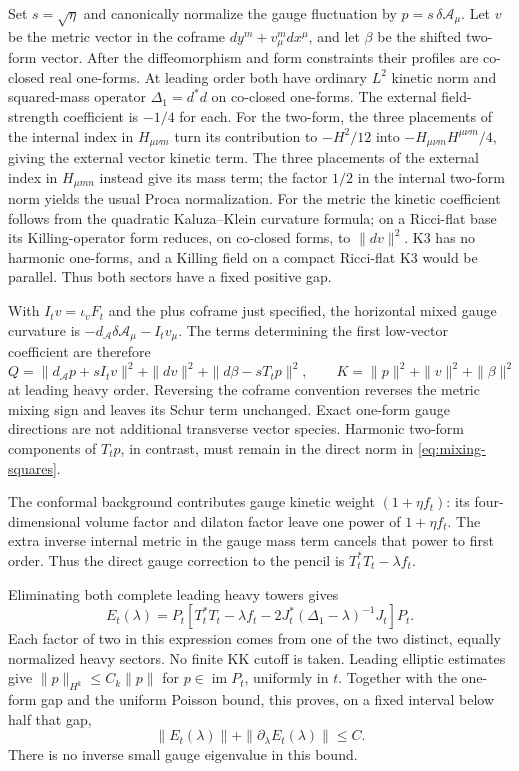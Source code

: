 Set $s=\sqrt\eta$ and canonically normalize the gauge fluctuation by
$p=s\,\delta\mathcal A_\mu$. Let $v$ be the metric vector in the
coframe $dy^m+v^m_\mu dx^\mu$, and let $\beta$ be the shifted
two-form vector. After the diffeomorphism and form constraints their
profiles are co-closed real one-forms. At leading order both have
ordinary $L^2$ kinetic norm and squared-mass operator
$\Delta_1=d^*d$ on co-closed one-forms. The external field-strength
coefficient is $-1/4$ for each. For the two-form, the three placements
of the internal index in $H_{\mu\nu m}$ turn its contribution to
$-H^2/12$ into $-H_{\mu\nu m}H^{\mu\nu m}/4$, giving the
external vector kinetic term. The three placements of the external
index in $H_{\mu mn}$ instead give its mass term; the factor
$1/2$ in the internal two-form norm yields the usual Proca
normalization. For the metric the kinetic coefficient follows from the
quadratic Kaluza--Klein curvature formula; on a Ricci-flat base its
Killing-operator form reduces, on co-closed forms, to $\|dv\|^2$.
K3 has no harmonic one-forms, and a Killing field on a compact
Ricci-flat K3 would be parallel. Thus both sectors have a fixed
positive gap.

With $I_tv=\iota_vF_t$ and the plus coframe just specified, the
horizontal mixed gauge curvature is
$-d_{\mathcal A}\delta\mathcal A_\mu-I_tv_\mu$.
The terms determining the first low-vector coefficient are therefore
\begin{equation}\label{eq:mixing-squares}
 Q=\|d_{\mathcal A}p+sI_tv\|^2+\|dv\|^2
                      +\|d\beta-sT_tp\|^2,
 \qquad K=\|p\|^2+\|v\|^2+\|\beta\|^2
\end{equation}
at leading heavy order. Reversing the coframe convention reverses
the metric mixing sign and leaves its Schur term unchanged. Exact
one-form gauge directions are not additional transverse vector
species. Harmonic two-form components of $T_tp$, in contrast, must
remain in the direct norm in \eqref{eq:mixing-squares}.

The conformal background contributes gauge kinetic weight
$(1+\eta f_t)$: its four-dimensional volume factor and dilaton
factor leave one power of $1+\eta f_t$. The extra inverse internal
metric in the gauge mass term cancels that power to first order.
Thus the direct gauge correction to the pencil is
$T_t^*T_t-\lambda f_t$.

Eliminating both complete leading heavy towers gives
\begin{equation}\label{eq:effectivecoefficient}
 E_t(\lambda)=P_t\left[T_t^*T_t-\lambda f_t
           -2J_t^*(\Delta_1-\lambda)^{-1}J_t\right]P_t.
\end{equation}
Each factor of two in this expression comes from one of the two
distinct, equally normalized heavy sectors. No finite KK cutoff is
taken. Leading elliptic estimates give
$\|p\|_{H^k}\le C_k\|p\|$ for $p\in\operatorname{im}P_t$,
uniformly in $t$. Together with the one-form gap and the uniform
Poisson bound, this proves, on a fixed interval below half that gap,
\begin{equation}\label{eq:Ebound}
 \|E_t(\lambda)\|+\|\partial_\lambda E_t(\lambda)\|\le C.
\end{equation}
There is no inverse small gauge eigenvalue in this bound.

